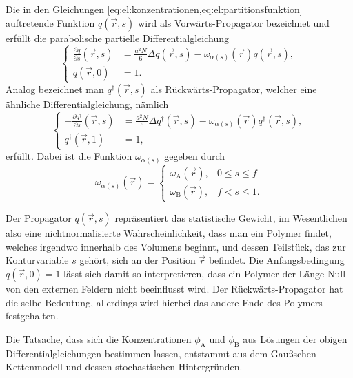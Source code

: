 Die in den Gleichungen \cref{eq:el:konzentrationen,eq:el:partitionsfunktion} auftretende Funktion $q(\vec{r}, s)$ wird als Vorwärts-Propagator bezeichnet und erfüllt die parabolische partielle Differentialgleichung
\begin{equation}
\label{eq:el:forward_propagator}
    \left\{
    \begin{aligned}
        \frac{\partial q}{\partial s}(\vec{r}, s) &= \frac{a^{2}N}{6} \Delta q(\vec{r}, s) - \omega_{\alpha(s)}(\vec{r}) q(\vec{r}, s),\\
        q(\vec{r}, 0) &= 1.
    \end{aligned}
    \right.
\end{equation}%
Analog bezeichnet man $q^{\dagger}(\vec{r}, s)$ als Rückwärts-Propagator, welcher eine ähnliche Differentialgleichung, nämlich
\begin{equation}
\label{eq:el:backward_propagator}
    \left\{
    \begin{aligned}
        -\frac{\partial q^{\dagger}}{\partial s}(\vec{r}, s) &= \frac{a^{2}N}{6} \Delta q^{\dagger}(\vec{r}, s) - \omega_{\alpha(s)}(\vec{r}) q^{\dagger}(\vec{r}, s),\\
        q^{\dagger}(\vec{r}, 1) &= 1,
    \end{aligned}
    \right.
\end{equation}%
erfüllt.
Dabei ist die Funktion $\omega_{\alpha(s)}$ gegeben durch
\begin{equation}
    \omega_{\alpha(s)}(\vec{r}) = \begin{cases}
        \omega_{\mathrm{A}}(\vec{r}), & 0 \leq s \leq f\\
        \omega_{\mathrm{B}}(\vec{r}), & f < s \leq 1.
    \end{cases}
\end{equation}

Der Propagator $q(\vec{r}, s)$ repräsentiert das statistische Gewicht, im Wesentlichen also eine nichtnormalisierte Wahrscheinlichkeit, dass man ein Polymer findet, welches irgendwo innerhalb des Volumens beginnt, und dessen Teilstück, das zur Konturvariable $s$ gehört, sich an der Position $\vec{r}$ befindet.
Die Anfangsbedingung $q(\vec{r}, 0) = 1$ lässt sich damit so interpretieren, dass ein Polymer der Länge Null von den externen Feldern nicht beeinflusst wird.
Der Rückwärts-Propagator hat die selbe Bedeutung, allerdings wird hierbei das andere Ende des Polymers festgehalten.

Die Tatsache, dass sich die Konzentrationen $\phi_{\mathrm{A}}$ und $\phi_{\mathrm{B}}$ aus Lösungen der obigen Differentialgleichungen bestimmen lassen, entstammt aus dem Gaußschen Kettenmodell und dessen stochastischen Hintergründen.

